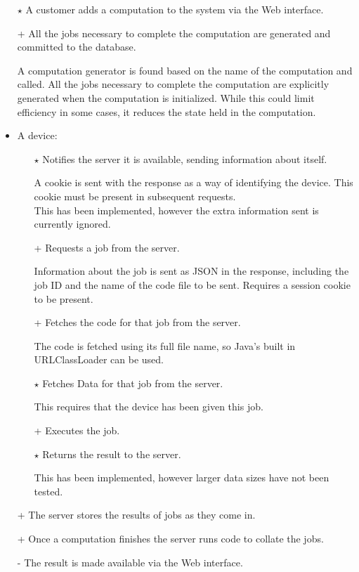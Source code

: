 \documentclass[a4paper,10pt]{article}
\begin{document}
\begin{itemize}
\item[$\star$] A customer adds a computation to the system via the Web interface.



\item[+] All the jobs necessary to complete the computation are generated and committed to the database.

A computation generator is found based on the name of the computation and called.
All the jobs necessary to complete the computation are explicitly generated when the computation is initialized.
While this could limit efficiency in some cases, it reduces the state held in the computation.

\item A device:
\begin{itemize}
\item[$\star$] Notifies the server it is available, sending information about itself.

A cookie is sent with the response as a way of identifying the device.
This cookie must be present in subsequent requests.\\
This has been implemented, however the extra information sent is currently ignored.

\item[+] Requests a job from the server.

Information about the job is sent as JSON in the response, including the job ID and the name of the code file to be sent.
Requires a session cookie to be present.

\item[+] Fetches the code for that job from the server.

The code is fetched using its full file name, so Java's built in URLClassLoader can be used.

\item[$\star$] Fetches Data for that job from the server.

This requires that the device has been given this job.

\item[+] Executes the job.


\item[$\star$] Returns the result to the server.

This has been implemented, however larger data sizes have not been tested.
\end{itemize}

\item[+] The server stores the results of jobs as they come in.

\item[+] Once a computation finishes the server runs code to collate the jobs.

\item[-] The result is made available via the Web interface.
\end{itemize}
\end{document}
